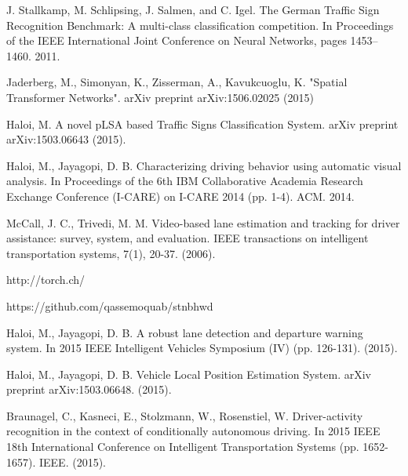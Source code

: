 \documentclass[conference]{IEEEtran}
\begin{document}
%
%
%
\begin{thebibliography}{1}

 J. Stallkamp, M. Schlipsing, J. Salmen, and C. Igel. The German Traffic Sign Recognition Benchmark: A multi-class classification competition. In Proceedings of the IEEE International Joint Conference on Neural Networks, pages 1453–1460. 2011. 

 Jaderberg, M., Simonyan, K., Zisserman, A., Kavukcuoglu, K. "Spatial Transformer Networks". arXiv preprint arXiv:1506.02025 (2015)

 Haloi, M. A novel pLSA based Traffic Signs Classification System. arXiv preprint arXiv:1503.06643 (2015).

 Haloi, M., Jayagopi, D. B. Characterizing driving behavior using automatic visual analysis. In Proceedings of the 6th IBM Collaborative Academia Research Exchange Conference (I-CARE) on I-CARE 2014 (pp. 1-4). ACM. 2014.

 McCall, J. C.,  Trivedi, M. M. Video-based lane estimation and tracking for driver assistance: survey, system, and evaluation. IEEE transactions on intelligent transportation systems, 7(1), 20-37. (2006).

 http://torch.ch/

 https://github.com/qassemoquab/stnbhwd

Haloi, M.,  Jayagopi, D. B. A robust lane detection and departure warning system. In 2015 IEEE Intelligent Vehicles Symposium (IV) (pp. 126-131). (2015).

 Haloi, M.,  Jayagopi, D. B. Vehicle Local Position Estimation System. arXiv preprint arXiv:1503.06648. (2015).

Braunagel, C., Kasneci, E., Stolzmann, W.,  Rosenstiel, W. Driver-activity recognition in the context of conditionally autonomous driving. In 2015 IEEE 18th International Conference on Intelligent Transportation Systems (pp. 1652-1657). IEEE. (2015).


\end{thebibliography}
\end{document}
